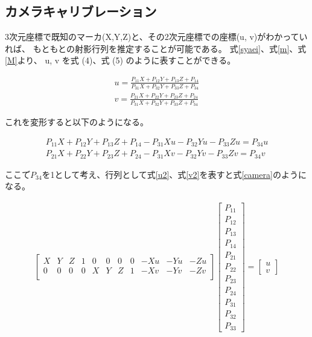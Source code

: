 \documentclass[11pt,a4j]{jsarticle}
\begin{document}
\subsection{カメラキャリブレーション}
\label{sub:カメラキャリブレーション}

3次元座標で既知のマーカ(X,Y,Z)と、その2次元座標での座標(u, v)がわかっていれば、
もともとの射影行列を推定することが可能である。
式\ref{syaei}、式\ref{m}、式\ref{M}より、
u, v を式 (4)、式 (5) のように表すことができる。

\begin{align}
  u = \frac{P_{11}X + P_{12}Y + P_{13}Z + P_{14}}{P_{31}X + P_{32}Y + P_{33}Z + P_{34}}
  \label{u} \\[0.3cm]
  v = \frac{P_{21}X + P_{22}Y + P_{23}Z + P_{24}}{P_{31}X + P_{32}Y + P_{33}Z + P_{34}}
  \label{v}
\end{align}

これを変形すると以下のようになる。

\begin{align}
  P_{11}X + P_{12}Y + P_{13}Z + P_{14} - P_{31}Xu - P_{32}Yu - P_{33}Zu = P_{34}u
  \label{u2} \\
  P_{21}X + P_{22}Y + P_{23}Z + P_{24} - P_{31}Xv - P_{32}Yv - P_{33}Zv = P_{34}v
  \label{v2}
\end{align}

ここて$゙P_{34}$を1として考え、行列として式\ref{u2}、式\ref{v2}を表すと式\ref{camera}のようになる。

\begin{align}
  \left[
    \begin{array}{ccccccccccc}
      X & Y & Z & 1 & 0 & 0 & 0 & 0 & -Xu & -Yu & -Zu \\
      0 & 0 & 0 & 0 & X & Y & Z & 1 & -Xv & -Yv & -Zv \\
    \end{array}
  \right]
  \left[
    \begin{array}{c}
      P_{11} \\ P_{12} \\ P_{13} \\ P_{14} \\
      P_{21} \\ P_{22} \\ P_{23} \\ P_{24} \\
      P_{31} \\ P_{32} \\ P_{33}
    \end{array}
  \right]
  =
  \left[
    \begin{array}{c}
      u \\ v
    \end{array}
  \right]
  \label{camera}
\end{align}
\end{document}
